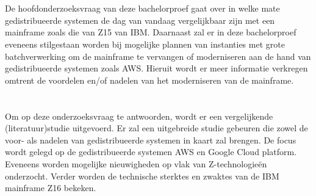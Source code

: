 \section{}
\label{sec:onderzoeksvraag}

De hoofdonderzoeksvraag van deze bachelorproef gaat over in welke mate gedistribueerde systemen de dag van vandaag vergelijkbaar zijn met een mainframe zoals die van Z15 van IBM. Daarnaast zal er in deze bachelorproef eveneens stilgestaan worden bij mogelijke plannen van instanties met grote batchverwerking om de mainframe te vervangen of moderniseren aan de hand van gedistribueerde systemen zoals AWS. Hieruit wordt er meer informatie verkregen omtrent de voordelen en/of nadelen van het moderniseren van de mainframe. 

\section{}
\label{sec:onderzoeksdoelstelling}

\subsection{}

Om op deze onderzoeksvraag te antwoorden, wordt er een vergelijkende (literatuur)studie uitgevoerd. Er zal een uitgebreide studie gebeuren die zowel de voor- als nadelen van gedistribueerde systemen in kaart zal brengen. De focus wordt gelegd op de gedistribueerde systemen AWS en Google Cloud platform. Eveneens worden mogelijke nieuwigheden op vlak van Z-technologieën onderzocht. Verder worden de technische sterktes en zwaktes van de IBM mainframe Z16 bekeken.

\subsection{}

